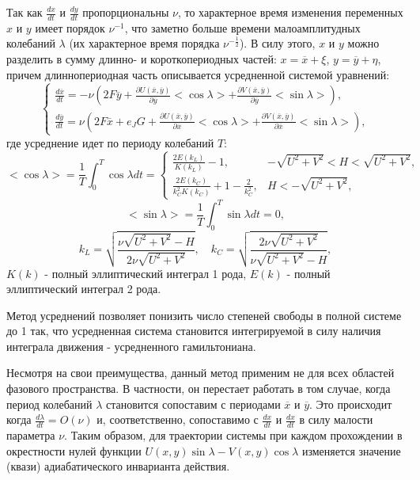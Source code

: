 Так как $\frac{dx}{dt}$ и $\frac{dy}{dt}$ пропорциональны $\nu$, то характерное время изменения переменных $x$ и $y$ имеет порядок $\nu^{-1}$, что заметно больше времени малоамплитудных колебаний $\lambda$ (их характерное время порядка $\nu^{-\frac12}$). В силу этого, $x$ и $y$ можно разделить в сумму длинно- и короткопериодных частей: $x=\overline x + \xi$, $y=\overline y + \eta$, причем длиннопериодная часть описывается усредненной системой уравнений:
\begin{equation}
    \begin{cases}
        \frac{d \overline x}{dt} = -\nu \left( 2F \overline y+\frac{\partial U(\overline x,\overline y)}{\partial \overline y} <\cos \lambda> + \frac{\partial V(\overline x,\overline y)}{\partial \overline y} <\sin \lambda> \right), \\
        \frac{d \overline y}{dt} = \nu \left( 2F \overline x+e_JG +\frac{\partial U(\overline x,\overline y)}{\partial \overline x} <\cos \lambda> + \frac{\partial V(\overline x,\overline y)}{\partial \overline x} <\sin \lambda> \right),
    \end{cases}
\end{equation}
где усреднение идет по периоду колебаний $T$:
$$<\cos \lambda>= \frac{1}{T} \int_0^T \cos \lambda dt = 
    \begin{cases} 
        \frac{2E(k_L)}{K(k_L)} - 1, &  -\sqrt{U^2+V^2} < H < \sqrt{U^2+V^2},\\
        \frac{2E(k_C)}{k_C^2 K(k_C)} + 1 - \frac{2}{k_C^2}, & H < -\sqrt{U^2+V^2},
    \end{cases}$$
$$<\sin \lambda>= \frac{1}{T} \int_0^T \sin \lambda dt = 0,$$
$$
k_L = \sqrt{\frac{\nu \sqrt{U^2+V^2} - H}{2 \nu \sqrt{U^2+V^2}}},\quad
k_C = \sqrt{\frac{2 \nu \sqrt{U^2+V^2}}{\nu \sqrt{U^2+V^2} - H}},
$$
$K(k)$ - полный эллиптический интеграл 1 рода,
$E(k)$ - полный эллиптический интеграл 2 рода.

Метод усреднений позволяет понизить число степеней свободы в полной системе до 1 так, что усредненная система становится интегрируемой в силу наличия интеграла движения - усредненного гамильтониана. 

Несмотря на свои преимущества, данный метод применим не для всех областей фазового пространства. В частности, он перестает работать в том случае, когда период колебаний $\lambda$ становится сопоставим с периодами $\overline x$ и $\overline y$. Это происходит когда $\frac{d \lambda}{dt} = O(\nu)$ и, соответственно, сопоставимо с $\frac{dx}{dt}$ и $\frac{dx}{dt}$ в силу малости параметра $\nu$. Таким образом, для траектории системы при каждом прохождении в окрестности нулей функции $U(x,y)\sin \lambda - V(x,y) \cos \lambda$ изменяется значение (квази) адиабатического инварианта действия.